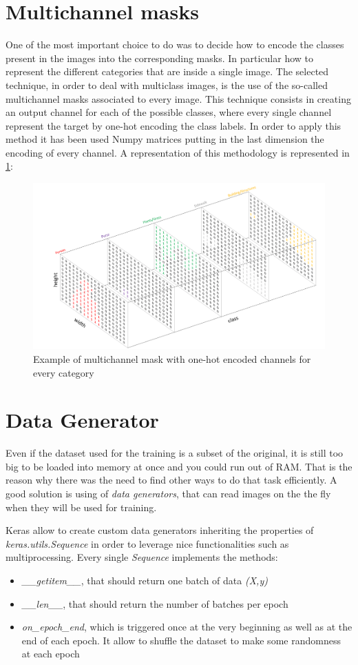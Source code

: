 \documentclass[a4paper,10pt]{report}
\begin{document}
\section{Multichannel masks}\label{sec:section-32}
One of the most important choice to do was to decide how to encode the classes present in the images into the corresponding masks. In particular how to represent the different categories that are inside a single image. The selected technique, in order to deal with multiclass images, is the use of the so-called multichannel masks associated to every image. This technique consists in creating an output channel for each of the possible classes, where every single channel represent the target by one-hot encoding the class labels. In order to apply this method it has been used Numpy matrices putting in the last dimension the encoding of every channel.
A representation of this methodology is represented in \ref{fig:{multimask}}:

\begin{figure}[h]
  \center
  \includegraphics[width=0.65\linewidth]{assets/img/multimask.png}
  \caption{Example of multichannel mask with one-hot encoded channels for every category}
  \label{fig:{multimask}}
\end{figure}


\section{Data Generator}\label{sec:section-33}
Even if the dataset used for the training is a subset of the original, it is still too big to be loaded into memory at once and you could run out of RAM.
That is the reason why there was the need to find other ways to do that task efficiently.
A good solution is using of \textit{data generators}, that can read images on the the fly when they will be used for training.

Keras allow to create custom data generators inheriting the properties of \emph{keras.utils.Sequence} in order to leverage nice functionalities such as multiprocessing.
Every single \emph{Sequence} implements the methods:
\begin{itemize}
    \item \emph{__getitem__}, that should return one batch of data \emph{(X,y)}
    \item \emph{__len__}, that should return the number of batches per epoch
    \item \emph{on_epoch_end}, which is triggered once at the very beginning as well as at the end of each epoch. It allow to shuffle the dataset to make some randomness at each epoch
\end{itemize}
\end{document}
